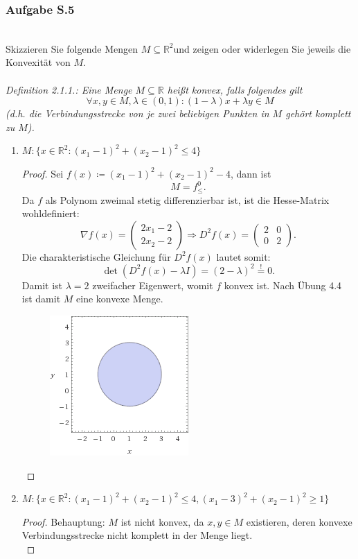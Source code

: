 \documentclass[12pt]{extreport} %
\newcommand{\R}{\mathbb{R}}
\theoremstyle{named}
\theoremstyle{nnamed}
\theoremstyle{itshape}
\theoremstyle{normal}
\begin{document}
\newpage

\subsubsection{Aufgabe S.5} ~\\
Skizzieren Sie folgende Mengen $M \subseteq \R^2$und zeigen oder widerlegen Sie jeweils die Konvexität von $M$. ~\\ ~\\

\textit{Definition 2.1.1.:  Eine Menge $M \subseteq \R$ heißt konvex, falls folgendes gilt}
$$  \forall x, y \in M, \lambda \in (0, 1): (1-\lambda)x + \lambda y \in M $$
\textit{(d.h. die Verbindungsstrecke von je zwei beliebigen Punkten in $M$ gehört komplett zu $M$).}

\begin{enumerate}
	\item $M \colon \big\{ x \in \R^2 \colon \left( x_1 - 1 \right)^2 + \left( x_2 - 1 \right)^2 \leq 4 \big\}$
		\begin{proof}
			Sei $f(x) \coloneqq \left( x_1 - 1 \right)^2 + \left( x_2 - 1 \right)^2 - 4$, dann ist 
			$$ M = f_{\leq}^{0}. $$
			Da $f$ als Polynom zweimal stetig differenzierbar ist, ist die Hesse-Matrix wohldefiniert:
			$$ \nabla f(x) = \left(\begin{array}{c} 2x_1 - 2 \\ 2 x_2 -2 \end{array}\right) \Rightarrow D^2 f(x) =\left(\begin{array}{rr} 2 &  0 \\
     0 & 2 \end{array}\right) . $$
     Die charakteristische Gleichung für $D^2 f(x)$ lautet somit:
     	$$\det (D^2 f(x) -  \lambda I) = (2-\lambda)^2 \overset{!}{=} 0.$$
     Damit ist $\lambda = 2$ zweifacher Eigenwert, womit $f$ konvex ist. Nach Übung 4.4 ist damit $M$ eine konvexe Menge.
			\begin{figure}[h!] \centering
  					\includegraphics[scale=0.55]{img/suv-i}
 					 \label{fig:fig1}
			\end{figure}
		\end{proof} 
	\item $M \colon \big\{ x \in \R^2 \colon \left( x_1 - 1 \right)^2 + \left( x_2 - 1 \right)^2 \leq 4, \left( x_1 - 3 \right)^2 + \left( x_2 - 1 \right)^2 \geq 1 \big\}$
		\begin{proof}
		Behauptung: $M$ ist nicht konvex, da $x,y \in M$ existieren, deren konvexe Verbindungsstrecke nicht komplett in der Menge liegt. ~\\
		

\end{proof}
\end{enumerate}
\end{document}
